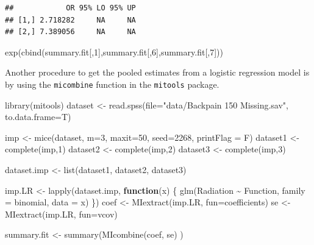 \documentclass[
]{book}
\newenvironment{Shaded}{\begin{snugshade}}{\end{snugshade}}
\newcommand{\AttributeTok}[1]{\textcolor[rgb]{0.77,0.63,0.00}{#1}}
\newcommand{\ControlFlowTok}[1]{\textcolor[rgb]{0.13,0.29,0.53}{\textbf{#1}}}
\newcommand{\DecValTok}[1]{\textcolor[rgb]{0.00,0.00,0.81}{#1}}
\newcommand{\FunctionTok}[1]{\textcolor[rgb]{0.00,0.00,0.00}{#1}}
\newcommand{\NormalTok}[1]{#1}
\newcommand{\OtherTok}[1]{\textcolor[rgb]{0.56,0.35,0.01}{#1}}
\newcommand{\SpecialCharTok}[1]{\textcolor[rgb]{0.00,0.00,0.00}{#1}}
\newcommand{\StringTok}[1]{\textcolor[rgb]{0.31,0.60,0.02}{#1}}
\begin{document}
\begin{verbatim}
##            OR 95% LO 95% UP
## [1,] 2.718282     NA     NA
## [2,] 7.389056     NA     NA
\end{verbatim}

exp(cbind(summary.fit{[},1{]},summary.fit{[},6{]},summary.fit{[},7{]}))

Another procedure to get the pooled estimates from a logistic regression model is by using the \texttt{micombine} function in the \texttt{mitools} package.

\begin{Shaded}
\begin{Highlighting}[]
\FunctionTok{library}\NormalTok{(mitools)}
\NormalTok{dataset }\OtherTok{\textless{}{-}} \FunctionTok{read.spss}\NormalTok{(}\AttributeTok{file=}\StringTok{"data/Backpain 150 Missing.sav"}\NormalTok{, }\AttributeTok{to.data.frame=}\NormalTok{T)}
 
\NormalTok{imp }\OtherTok{\textless{}{-}} \FunctionTok{mice}\NormalTok{(dataset, }\AttributeTok{m=}\DecValTok{3}\NormalTok{, }\AttributeTok{maxit=}\DecValTok{50}\NormalTok{, }\AttributeTok{seed=}\DecValTok{2268}\NormalTok{, }\AttributeTok{printFlag =}\NormalTok{ F)}
\NormalTok{dataset1 }\OtherTok{\textless{}{-}} \FunctionTok{complete}\NormalTok{(imp,}\DecValTok{1}\NormalTok{)}
\NormalTok{dataset2 }\OtherTok{\textless{}{-}} \FunctionTok{complete}\NormalTok{(imp,}\DecValTok{2}\NormalTok{)}
\NormalTok{dataset3 }\OtherTok{\textless{}{-}} \FunctionTok{complete}\NormalTok{(imp,}\DecValTok{3}\NormalTok{)}
 
\NormalTok{dataset.imp }\OtherTok{\textless{}{-}} \FunctionTok{list}\NormalTok{(dataset1, dataset2, dataset3)}
 
\NormalTok{imp.LR }\OtherTok{\textless{}{-}} \FunctionTok{lapply}\NormalTok{(dataset.imp, }\ControlFlowTok{function}\NormalTok{(x) \{}
   \FunctionTok{glm}\NormalTok{(Radiation }\SpecialCharTok{\textasciitilde{}}\NormalTok{ Function, }\AttributeTok{family =}\NormalTok{ binomial, }\AttributeTok{data =}\NormalTok{ x)}
\NormalTok{  \})}
\NormalTok{coef }\OtherTok{\textless{}{-}} \FunctionTok{MIextract}\NormalTok{(imp.LR, }\AttributeTok{fun=}\NormalTok{coefficients) }
\NormalTok{se }\OtherTok{\textless{}{-}} \FunctionTok{MIextract}\NormalTok{(imp.LR, }\AttributeTok{fun=}\NormalTok{vcov) }
 
\NormalTok{summary.fit }\OtherTok{\textless{}{-}} \FunctionTok{summary}\NormalTok{(}\FunctionTok{MIcombine}\NormalTok{(coef, se) )}
\end{Highlighting}
\end{Shaded}
\end{document}
